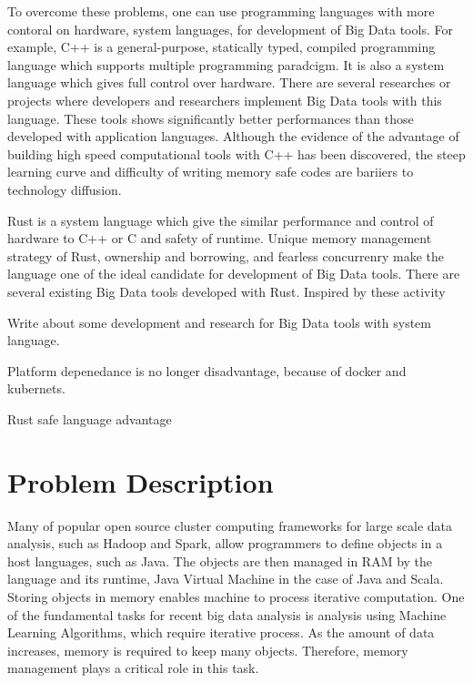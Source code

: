 To overcome these problems, one can use programming languages with more contoral on hardware, system languages, for development of Big Data tools. For example, C++ is a general-purpose, statically typed, 
compiled programming language which supports multiple programming paradcigm. It is also a system language which gives full control over hardware. There are several researches or projects where developers and 
researchers implement Big Data tools with this language. These tools shows significantly better performances than those developed with application languages. 
Although the evidence of the advantage of building high speed computational tools with C++ has been discovered, the steep learning curve and difficulty of writing memory safe codes are bariiers to technology diffusion.

Rust is a system language which give the similar performance and control of hardware to C++ or C and safety of runtime. Unique memory management strategy of Rust, ownership and borrowing, and fearless concurrenry 
make the language one of the ideal candidate for development of Big Data tools. There are several existing Big Data tools developed with Rust. Inspired by these activity

Write about some development and research for Big Data tools with system language. 

Platform depenedance is no longer disadvantage, because of docker and kubernets.

Rust safe language advantage






\section{Problem Description}
\label{sec:history}

Many of popular open source cluster computing frameworks for large scale data analysis, 
such as Hadoop and Spark, allow programmers to define objects in a host languages, such as Java.
The objects are then managed in RAM by the language and its runtime, Java Virtual Machine 
in the case of Java and Scala. Storing objects in memory enables machine to process iterative computation. 
One of the fundamental tasks for recent big data analysis is analysis using Machine Learning Algorithms, 
which require iterative process. As the amount of data increases, memory is required to keep many objects. 
Therefore, memory management plays a critical role in this task. 


